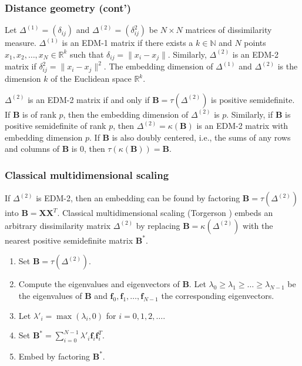 \documentclass[professionalfonts, hyperref={pdfpagelabels=false,
  colorlinks=true, linkcolor=purple}]{beamer}
\begin{document}
\begin{frame}
  \frametitle{Distance geometry (cont')}
  \begin{definition}
    \label{def:2}
    Let $\Delta^{(1)} = (\delta_{ij})$ and $\Delta^{(2)} =
    (\delta_{ij}^{2}) $ be $N \times N$ matrices of dissimilarity
    measure. $\Delta^{(1)}$ is an \alert{EDM-1 matrix} if there exists a $k
    \in \mathbb{N}$ and $N$ points $x_1, x_2, \dots, x_N \in
    \mathbb{R}^{k}$ such that $\delta_{ij} = \| x_i - x_j
    \|$. Similarly, $\Delta^{(2)}$ is an \alert{EDM-2 matrix} if
    $\delta_{ij}^{2} = \| x_i - x_j \|^2$. The \alert{embedding
      dimension} of $\Delta^{(1)}$ and $\Delta^{(2)}$ is the
    dimension $k$ of the Euclidean space $\mathbb{R}^{k}$. 
  \end{definition}
  \begin{fact}
    \label{thm:1}
    $\Delta^{(2)}$ is an EDM-2 matrix if and only if $\bm{B} =
    \tau(\Delta^{(2)})$ is \alert{positive semidefinite}. If $\bm{B}$
    is of rank $p$, then the embedding dimension of $\Delta^{(2)}$ is
    $p$. Similarly, if $\bm{B}$ is positive semidefinite of rank $p$,
    then $\Delta^{(2)} = \kappa(\bm{B})$ is an EDM-2 matrix with
    embedding dimension $p$. If $\bm{B}$ is also doubly centered,
    i.e., the sums of any rows and columns of $\bm{B}$ is $0$, then
    $\tau(\kappa(\bm{B})) = \bm{B}$.
  \end{fact}
\end{frame}
\begin{frame}
  \frametitle{Classical multidimensional scaling}
   If $\Delta^{(2)}$ is EDM-2, then an embedding can be
    found by factoring $\bm{B} = \tau(\Delta^{(2)})$ into $\bm{B} =
    \bm{X}\bm{X}^{T}$.  Classical multidimensional scaling (Torgerson
    \cite{torgesen52:_multid}) embeds an arbitrary dissimilarity
    matrix $\Delta^{(2)}$ by replacing $\bm{B} = \kappa(\Delta^{(2)})$
    with the nearest positive semidefinite matrix $\bm{B}^{*}$.  
  \begin{enumerate}
  \item Set $\bm{B} =  \tau(\Delta^{(2)})$.  
  \item Compute the eigenvalues and eigenvectors of $\bm{B}$. Let
    $\lambda_0 \geq \lambda_1 \geq \dots \geq \lambda_{N-1}$ be the
    eigenvalues of $\bm{B}$ and $\bm{f}_0, \bm{f}_1, \dots,
    \bm{f}_{N-1}$ the corresponding eigenvectors. 
  \item Let $\lambda'_i = \max(\lambda_i, 0)$ for $i =
    0,1,2,\dots$.
  \item Set $\bm{B}^{*} = \sum_{i=0}^{N-1}{\lambda'_i
      \bm{f}_i \bm{f}_i^{T}}$.   
  \item Embed by factoring $\bm{B}^{*}$. 
\end{enumerate}
\end{frame}
\end{document}
